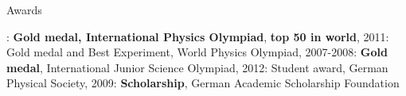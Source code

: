 \begin{rubric}{Awards}

\newcommand\textbox[1]{%
  \parbox{\textwidth}{#1}%
}
  \textbox{
: \textbf{Gold medal, International Physics Olympiad}, \textbf{top 50 in world}, 2011: Gold medal and Best Experiment, World Physics Olympiad, 2007-2008: \textbf{Gold medal}, International Junior Science Olympiad, 2012: Student award, German Physical Society, 2009: \textbf{Scholarship}, German Academic Scholarship Foundation}
\end{rubric}
